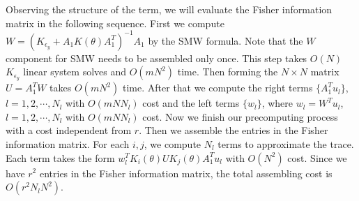 \documentclass[article,ij4uq]{ij4uq}              %
\begin{document}
Observing the structure of the term, we will evaluate the Fisher information matrix in the following sequence. First we compute $W=(K_{\epsilon_{y}}+A_{1}K(\theta)A_{1}^{T})^{-1}A_{1}$ by the SMW formula. Note that the $W$ component for SMW  needs to be assembled only once. This step takes $O(N)$ $K_{\epsilon_{y}}$ linear system solves and $O(mN^{2})$ time. Then forming the $N\times N$ matrix $U=A_{1}^{T}W$ takes $O(mN^{2})$ time. After that we compute the right terms $\{A_{1}^{T}u_{l}\}$, $l=1,2,\cdots,N_{l}$ with $O(mNN_{l})$ cost and the left terms $\{w_{l}\}$, where $w_{l}=W^{T}u_{l}$, $l=1,2,\cdots,N_{l}$ with $O(mNN_{l})$ cost. Now we finish our precomputing process with a cost independent from $r$. Then we assemble the entries in the Fisher information matrix. For each $i,j$, we compute $N_{l}$ terms to approximate the trace. Each term takes the form $w_{l}^{T}K_{i}(\theta)UK_{j}(\theta)A_{1}^{T}u_{l}$ with $O(N^{2})$ cost. Since we have $r^{2}$ entries in the Fisher information matrix, the total assembling cost is $O(r^{2}N_{l}N^{2})$. 
\end{document}
